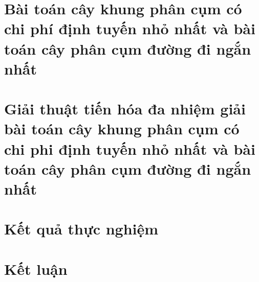 \documentclass[a4paper,12pt]{report}
\begin{document}
\chapter{Bài toán cây khung phân cụm có chi phí định tuyến nhỏ nhất và bài toán cây phân cụm đường đi ngắn nhất}
\label{Chap_BTCayKhungPhanCum}



\chapter{Giải thuật tiến hóa đa nhiệm giải bài toán cây khung phân cụm có chi phi định tuyến nhỏ nhất và bài toán cây phân cụm đường đi ngắn nhất}
\label{Chap_mfeaGiaiCayPhanCum}




\chapter{Kết quả thực nghiệm}
\label{Chap_kqThucNghiem}




\chapter{Kết luận}
\label{Chap_Ketluan}


\newpage


%






\end{document}
